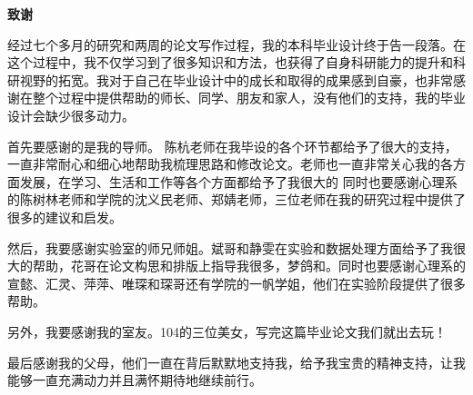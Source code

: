 \cleardoublepage{}
\begin{center}
    \bfseries {} 致谢
\end{center}

经过七个多月的研究和两周的论文写作过程，我的本科毕业设计终于告一段落。在这个过程中，我不仅学习到了很多知识和方法，也获得了自身科研能力的提升和科研视野的拓宽。我对于自己在毕业设计中的成长和取得的成果感到自豪，也非常感谢在整个过程中提供帮助的师长、同学、朋友和家人，没有他们的支持，我的毕业设计会缺少很多动力。

首先要感谢的是我的导师。
陈杭老师在我毕设的各个环节都给予了很大的支持，一直非常耐心和细心地帮助我梳理思路和修改论文。老师也一直非常关心我的各方面发展，在学习、生活和工作等各个方面都给予了我很大的
同时也要感谢心理系的陈树林老师和学院的沈义民老师、郑婧老师，三位老师在我的研究过程中提供了很多的建议和启发。

然后，我要感谢实验室的师兄师姐。斌哥和静雯在实验和数据处理方面给予了我很大的帮助，花哥在论文构思和排版上指导我很多，梦鸽和。同时也要感谢心理系的宣懿、汇灵、萍萍、唯琛和琛哥还有学院的一帆学姐，他们在实验阶段提供了很多帮助。

另外，我要感谢我的室友。104的三位美女，写完这篇毕业论文我们就出去玩！

最后感谢我的父母，他们一直在背后默默地支持我，给予我宝贵的精神支持，让我能够一直充满动力并且满怀期待地继续前行。
